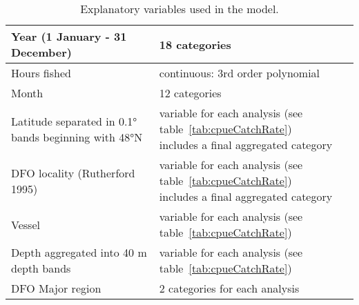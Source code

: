 \begin{table}[b]
\centering
\caption{\label{tab:cpueExplanatory} Explanatory variables used in the model.}
\begin{tabular}{ll}
\hline
Year (1 January - 31 December) & 18 categories \\
\hline
Hours fished & continuous: 3rd order polynomial \\
\hline
Month & 12 categories\\
\hline
Latitude separated in 0.1° bands beginning with 48°N & \specialcell{variable for each analysis (see table~\ref{tab:cpueCatchRate})\\includes a final aggregated category} \\
\hline
DFO locality (Rutherford 1995) & \specialcell{variable for each analysis (see table~\ref{tab:cpueCatchRate})\\includes a final aggregated category} \\
\hline
Vessel & variable for each analysis (see table~\ref{tab:cpueCatchRate}) \\
\hline
Depth aggregated into 40 m depth bands & variable for each analysis (see table~\ref{tab:cpueCatchRate}) \\
\hline
DFO Major region & 2 categories for each analysis \\
\hline
\end{tabular}
\end{table}


\clearpage
